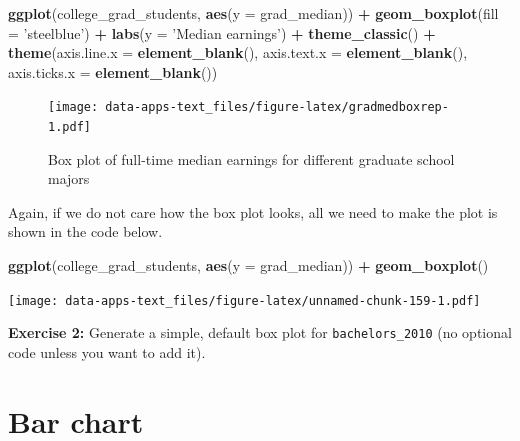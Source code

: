\documentclass[
]{book}
\newenvironment{Shaded}{\begin{snugshade}}{\end{snugshade}}
\newcommand{\DataTypeTok}[1]{\textcolor[rgb]{0.13,0.29,0.53}{#1}}
\newcommand{\KeywordTok}[1]{\textcolor[rgb]{0.13,0.29,0.53}{\textbf{#1}}}
\newcommand{\NormalTok}[1]{#1}
\newcommand{\OperatorTok}[1]{\textcolor[rgb]{0.81,0.36,0.00}{\textbf{#1}}}
\newcommand{\StringTok}[1]{\textcolor[rgb]{0.31,0.60,0.02}{#1}}
\newenvironment{learncheck}%
{%
  \par\vspace{\baselineskip}\noindent 
  \color{Exercise}\begin{itshape}%
  \par\vspace{\baselineskip}\noindent\ignorespaces 
}%
{%
  \end{itshape}\ignorespacesafterend 
}
\begin{document}
\begin{Shaded}
\begin{Highlighting}[]
\KeywordTok{ggplot}\NormalTok{(college_grad_students, }\KeywordTok{aes}\NormalTok{(}\DataTypeTok{y =}\NormalTok{ grad_median)) }\OperatorTok{+}
\StringTok{  }\KeywordTok{geom_boxplot}\NormalTok{(}\DataTypeTok{fill =} \StringTok{'steelblue'}\NormalTok{) }\OperatorTok{+}
\StringTok{  }\KeywordTok{labs}\NormalTok{(}\DataTypeTok{y =} \StringTok{'Median earnings'}\NormalTok{) }\OperatorTok{+}
\StringTok{  }\KeywordTok{theme_classic}\NormalTok{() }\OperatorTok{+}
\StringTok{  }\KeywordTok{theme}\NormalTok{(}\DataTypeTok{axis.line.x =} \KeywordTok{element_blank}\NormalTok{(),}
        \DataTypeTok{axis.text.x =} \KeywordTok{element_blank}\NormalTok{(),}
        \DataTypeTok{axis.ticks.x =} \KeywordTok{element_blank}\NormalTok{())}
\end{Highlighting}
\end{Shaded}

\begin{figure}
\centering
\texttt{[image: data-apps-text\_files/figure-latex/gradmedboxrep-1.pdf]}
\caption{\label{fig:gradmedboxrep}Box plot of full-time median earnings for different graduate school majors}
\end{figure}

Again, if we do not care how the box plot looks, all we need to make the plot is shown in the code below.

\begin{Shaded}
\begin{Highlighting}[]
\KeywordTok{ggplot}\NormalTok{(college_grad_students, }\KeywordTok{aes}\NormalTok{(}\DataTypeTok{y =}\NormalTok{ grad_median)) }\OperatorTok{+}
\StringTok{  }\KeywordTok{geom_boxplot}\NormalTok{()}
\end{Highlighting}
\end{Shaded}

\texttt{[image: data-apps-text\_files/figure-latex/unnamed-chunk-159-1.pdf]}

\begin{learncheck}
\textbf{Exercise 2:} Generate a simple, default box plot for
\texttt{bachelors\_2010} (no optional code unless you want to add it).
\end{learncheck}

\hypertarget{bar-chart}{%
\section{Bar chart}\label{bar-chart}}
\end{document}
